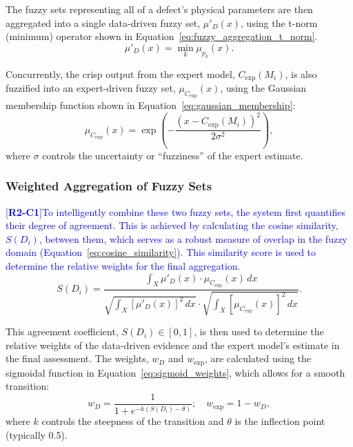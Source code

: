 \documentclass[energies,article,submit,pdftex,moreauthors]{Definitions/mdpi}
\newcommand{\revtag}[2]{[\textbf{R#1-C#2}]}
\newcommand{\Rtwo}[1]{\textcolor{blue}{#1}}
\begin{document}
The fuzzy sets representing all of a defect's physical parameters are then aggregated into a single data-driven fuzzy set, \(\mu'_{D}(x)\), using the t-norm (minimum) operator shown in Equation~\ref{eq:fuzzy_aggregation_t_norm}.
\begin{equation}
    \mu'_{D}(x) = \min_{k} \mu_{p_k}(x).
    \label{eq:fuzzy_aggregation_t_norm}
\end{equation}

Concurrently, the crisp output from the expert model, \(C_{\text{exp}}(M_i)\), is also fuzzified into an expert-driven fuzzy set, \(\mu_{C_{\text{exp}}}(x)\), using the Gaussian membership function shown in Equation~\ref{eq:gaussian_membership}:
\begin{equation}
    \mu_{C_{\text{exp}}}(x) = \exp\left(-\frac{(x - C_{\text{exp}}(M_i))^2}{2\sigma^2}\right),
    \label{eq:gaussian_membership}
\end{equation}
where \(\sigma\) controls the uncertainty or ``fuzziness'' of the expert estimate.

\subsubsection{Weighted Aggregation of Fuzzy Sets}
\Rtwo{\revtag{2}{1}To intelligently combine these two fuzzy sets, the system first quantifies their degree of agreement. This is achieved by calculating the cosine similarity, \(S(D_i)\), between them, which serves as a robust measure of overlap in the fuzzy domain (Equation~\ref{eq:cosine_similarity}). This similarity score is used to determine the relative weights for the final aggregation.}
\begin{equation}
    S(D_i) = \frac{\int_X \mu'_{D}(x) \cdot \mu_{C_{\text{exp}}}(x) \, dx}{\sqrt{\int_X [\mu'_{D}(x)]^2 \, dx} \cdot \sqrt{\int_X [\mu_{C_{\text{exp}}}(x)]^2 \, dx}}.
    \label{eq:cosine_similarity}
\end{equation}

This agreement coefficient, \(S(D_i) \in [0, 1]\), is then used to determine the relative weights of the data-driven evidence and the expert model's estimate in the final assessment. The weights, \(w_D\) and \(w_{\text{exp}}\), are calculated using the sigmoidal function in Equation~\ref{eq:sigmoid_weights}, which allows for a smooth transition:
\begin{equation}
    w_D = \frac{1}{1 + e^{-k(S(D_i) - \theta)}}; \quad w_{\text{exp}} = 1 - w_D,
    \label{eq:sigmoid_weights}
\end{equation}
where \(k\) controls the steepness of the transition and \(\theta\) is the inflection point (typically 0.5).
\end{document}
